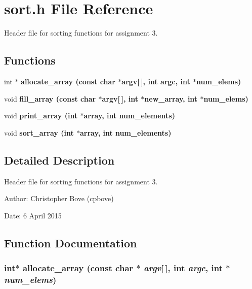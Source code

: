 \section{sort.h File Reference}
\label{sort_8h}
Header file for sorting functions for assignment 3. 

\subsection*{Functions}
\begin{CompactItemize}
\item 
int $\ast$ \bf{allocate\_\-array} (const char $\ast$argv[$\,$], int argc, int $\ast$num\_\-elems)
\item 
void \bf{fill\_\-array} (const char $\ast$argv[$\,$], int $\ast$new\_\-array, int $\ast$num\_\-elems)
\item 
void \bf{print\_\-array} (int $\ast$array, int num\_\-elements)
\item 
void \bf{sort\_\-array} (int $\ast$array, int num\_\-elements)
\end{CompactItemize}


\subsection{Detailed Description}
Header file for sorting functions for assignment 3. 

\begin{Desc}
\item[Author:]Christopher Bove (cpbove) \end{Desc}
\begin{Desc}
\item[Date:]6 April 2015 \end{Desc}


\subsection{Function Documentation}
\subsubsection{\setlength{\rightskip}{0pt plus 5cm}int$\ast$ allocate\_\-array (const char $\ast$ {\em argv}[$\,$], int {\em argc}, int $\ast$ {\em num\_\-elems})}\label{sort_8h_305a5d36cdfe1ffeff2da8f46d3d5454}


